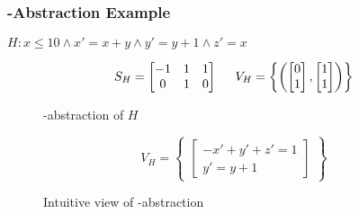 \begin{frame}[t]
	\frametitle{\qvasr-Abstraction Example}
	\begin{center}
		$H: x \leq 10 \land x' = x + y \land y' = y + 1 \land z' = x$
	\end{center}
		\begin{figure}
			\begin{equation*}
				S_H = \begin{bmatrix} -1 & 1 & 1 \\ 0 &1 &0 \end{bmatrix} \hspace*{0.5cm}
				V_H = 
				\begin{Bmatrix}
					\begin{pmatrix}
						\begin{bmatrix}
							0 \\
							1
						\end{bmatrix},
						\begin{bmatrix}
							1 \\
							1
						\end{bmatrix}
					\end{pmatrix}
				\end{Bmatrix}
			\end{equation*}
			\caption*{\qvasr-abstraction of $H$}
		\end{figure}
		\begin{figure}
			\begin{equation*}
				V_H = \begin{Bmatrix} \begin{bmatrix} -x' + y' + z' = 1 \\ y' = y + 1 \end{bmatrix} \end{Bmatrix}
			\end{equation*}
			\caption*{Intuitive view of \qvasr-abstraction} 
		\end{figure}
\end{frame}